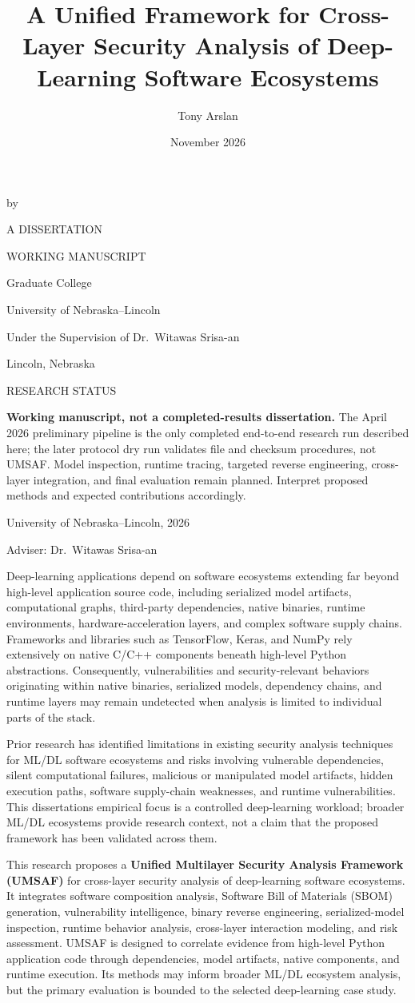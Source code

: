 \documentclass[
  12pt,
  letterpaper,
  oneside]{report}
\title{A Unified Framework for Cross-Layer Security Analysis of Deep-Learning Software Ecosystems}
\author{Tony Arslan}
\date{November 2026}
\makeatletter
\renewcommand{\maketitle}{
  \begin{titlepage}
    \centering
    \normalsize
    \singlespacing
    {\doublespacing\MakeUppercase{\@title}\par}
    \vspace{0.5in}
    by\par
    \vspace{0.5in}
    \@author\par
    \vfill
    A DISSERTATION\par
    \vspace{0.25in}
    WORKING MANUSCRIPT\par
    \vfill
    Graduate College\par
    \vspace{0.25in}
    University of Nebraska--Lincoln\par
    \vfill
    Under the Supervision of Dr.~Witawas Srisa-an\par
    \vfill
    Lincoln, Nebraska\par
    \vspace{0.15in}
    \@date\par
  \end{titlepage}
}
\newcommand{\abstractheading}{
  \clearpage
  \phantomsection
  \addcontentsline{toc}{chapter}{Abstract}
  \begingroup
    \centering
    \normalsize
    {\doublespacing\MakeUppercase{\@title}\par}
    \vspace{12pt}
    \@author\par
    University of Nebraska--Lincoln, 2026\par
  \endgroup
  \vspace{12pt}
  \noindent Adviser: Dr.~Witawas Srisa-an\par
  \vspace{12pt}
}
\makeatother
\begin{document}
\hypersetup{pageanchor=false}
\maketitle
\doublespacing

\hypersetup{pageanchor=true}
\clearpage
{}
{}
\begingroup
  \centering
  \normalsize
  RESEARCH STATUS\par
\endgroup
\vspace{12pt}
\noindent
\textbf{Working manuscript, not a completed-results dissertation.}
The April 2026 preliminary pipeline is the only completed end-to-end research run described here; the later protocol dry run validates file and checksum procedures, not UMSAF. Model inspection, runtime tracing, targeted reverse engineering, cross-layer integration, and final evaluation remain planned. Interpret proposed methods and expected contributions accordingly.
\abstractheading

\noindent
Deep-learning applications depend on software ecosystems extending far
beyond high-level application source code, including serialized model
artifacts, computational graphs, third-party dependencies, native
binaries, runtime environments, hardware-acceleration layers, and
complex software supply chains. Frameworks and libraries such as
TensorFlow, Keras, and NumPy rely extensively on native C/C++ components
beneath high-level Python abstractions. Consequently, vulnerabilities
and security-relevant behaviors originating within native binaries,
serialized models, dependency chains, and runtime layers may remain
undetected when analysis is limited to individual parts of the stack.

Prior research has identified limitations in existing security analysis
techniques for ML/DL software ecosystems and risks involving vulnerable
dependencies, silent computational failures, malicious or manipulated
model artifacts, hidden execution paths, software supply-chain
weaknesses, and runtime vulnerabilities. This
dissertation\textquotesingle s empirical focus is a controlled
deep-learning workload; broader ML/DL ecosystems provide research
context, not a claim that the proposed framework has been validated
across them.

This research proposes a \textbf{Unified Multilayer Security Analysis
Framework (UMSAF)} for cross-layer security analysis of deep-learning
software ecosystems. It integrates software composition analysis,
Software Bill of Materials (SBOM) generation, vulnerability
intelligence, binary reverse engineering, serialized-model inspection,
runtime behavior analysis, cross-layer interaction modeling, and risk
assessment. UMSAF is designed to correlate evidence from high-level
Python application code through dependencies, model artifacts, native
components, and runtime execution. Its methods may inform broader ML/DL
ecosystem analysis, but the primary evaluation is bounded to the
selected deep-learning case study.
\end{document}
